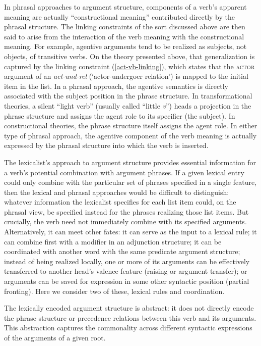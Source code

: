 \documentclass[output=paper
	        ,collection
	        ,collectionchapter
 	        ,biblatex
                ,babelshorthands
                ,newtxmath
                ,draftmode
                ,colorlinks, citecolor=brown
]{langscibook}
\begin{document}
In phrasal approaches  to argument structure, components of a verb's apparent meaning are actually ``constructional meaning'' contributed directly by the phrasal structure.  The linking constraints of the sort discussed above are then said to arise from the interaction of the verb meaning with the constructional meaning.  For example, agentive arguments tend to be realized as subjects, not objects, of transitive verbs.  On the theory presented above, that generalization is captured by the linking constraint (\ref{act-vb-linking}), which states that the \textsc{actor} argument of an \textit{act-und-rel} (`actor-undergoer relation') is mapped to the initial item in the \argst list.  In a phrasal approach, the agentive semantics is directly associated with the subject position in the phrase structure.  In transformational theories, a silent ``light verb'' (usually called ``little \textit{v}'') heads a projection in the phrase structure and assigns the agent role to its specifier (the subject).  In constructional theories, the phrase structure itself assigns the agent role.  In either type of phrasal approach, the agentive component of the verb meaning is actually expressed by the phrasal structure into which the verb is inserted.  


The lexicalist’s approach to argument structure provides essential information for a verb's potential
combination with argument phrases.   If a given lexical entry could only  combine with the particular set of phrases specified in a single \val feature, then the lexical and phrasal approaches would be difficult to distinguish: whatever information the lexicalist specifies for each \val list item could, on the phrasal view, be specified instead for the phrases realizing those list items.  
But crucially, the verb need not immediately combine with its specified
arguments.  Alternatively, it can meet other fates: it can serve as the input to a lexical rule; it
can combine first with a modifier in an adjunction structure; it can be coordinated with another
word with the same predicate argument structure; instead of being realized locally, one or more of
its arguments can be effectively transferred to another head’s valence feature (raising or argument
transfer); or arguments can be saved for expression in some other syntactic position (partial
fronting).   Here we consider two of these, lexical rules and coordination.  
 
The lexically encoded argument structure is abstract: it does not directly encode the phrase structure or
precedence relations between this verb and its arguments. This abstraction captures the commonality
across different syntactic expressions of the arguments of a given root.
\end{document}
